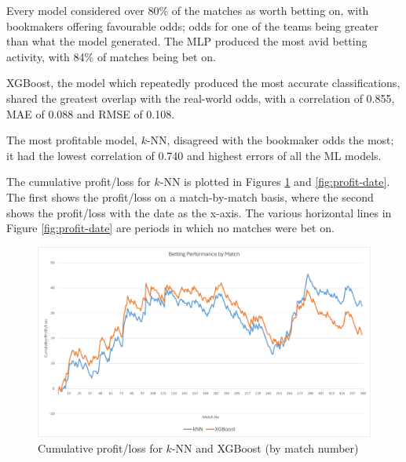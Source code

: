 Every model considered over 80\% of the matches as worth betting on, with bookmakers offering favourable odds; odds for one of the teams being greater than what the model generated. The MLP produced the most avid betting activity, with 84\% of matches being bet on.

XGBoost, the model which repeatedly produced the most accurate classifications, shared the greatest overlap with the real-world odds, with a correlation of 0.855, MAE of 0.088 and RMSE of 0.108.

The most profitable model, $k$-NN, disagreed with the bookmaker odds the most; it had the lowest correlation of 0.740 and highest errors of all the ML models. 

The cumulative profit/loss for $k$-NN is plotted in Figures \ref{fig:profit-match} and \ref{fig:profit-date}. The first shows the profit/loss on a match-by-match basis, where the second shows the profit/loss with the date as the x-axis. The various horizontal lines in Figure \ref{fig:profit-date} are periods in which no matches were bet on. 

\begin{figure}[h]
	\centering
	\begin{adjustbox}{center}
		\includegraphics[width=\textwidth]{Figures/profit-match-2.png}
	\end{adjustbox}
	\caption{Cumulative profit/loss for $k$-NN and XGBoost (by match number)}
	\label{fig:profit-match}
\end{figure}


